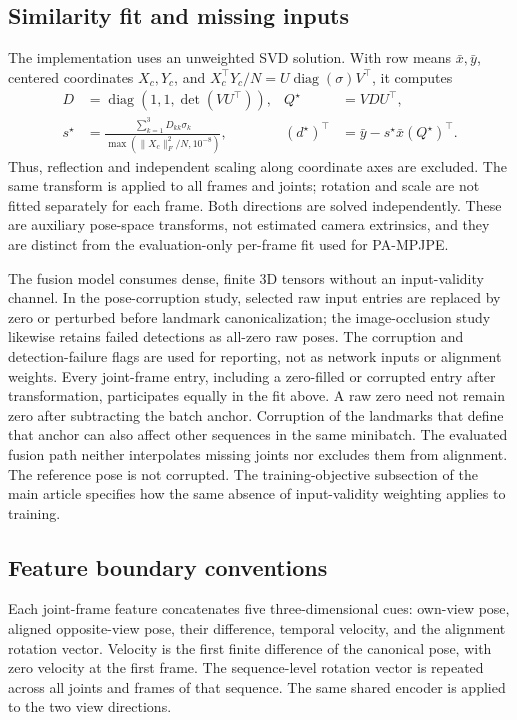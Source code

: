\documentclass[11pt,letterpaper]{article}
\begin{document}
\subsection{Similarity fit and missing inputs}
The implementation uses an unweighted SVD solution. With row means \(\bar{x},\bar{y}\), centered coordinates \(X_c,Y_c\), and \(X_c^\top Y_c/N=U\operatorname{diag}(\sigma)V^\top\), it computes
\[
\begin{aligned}
D&=\operatorname{diag}(1,1,\det(VU^\top)), & Q^\star&=VDU^\top,\\
s^\star&=\frac{\sum_{k=1}^{3}D_{kk}\sigma_k}
{\max(\|X_c\|_F^2/N,10^{-8})}, &
(d^\star)^\top&=\bar{y}-s^\star\bar{x}(Q^\star)^\top.
\end{aligned}
\]
Thus, reflection and independent scaling along coordinate axes are excluded. The same transform is applied to all frames and joints; rotation and scale are not fitted separately for each frame. Both directions are solved independently. These are auxiliary pose-space transforms, not estimated camera extrinsics, and they are distinct from the evaluation-only per-frame fit used for PA-MPJPE.

The fusion model consumes dense, finite 3D tensors without an input-validity channel. In the pose-corruption study, selected raw input entries are replaced by zero or perturbed before landmark canonicalization; the image-occlusion study likewise retains failed detections as all-zero raw poses. The corruption and detection-failure flags are used for reporting, not as network inputs or alignment weights. Every joint-frame entry, including a zero-filled or corrupted entry after transformation, participates equally in the fit above. A raw zero need not remain zero after subtracting the batch anchor. Corruption of the landmarks that define that anchor can also affect other sequences in the same minibatch. The evaluated fusion path neither interpolates missing joints nor excludes them from alignment. The reference pose is not corrupted. The training-objective subsection of the main article specifies how the same absence of input-validity weighting applies to training.

\subsection{Feature boundary conventions}
Each joint-frame feature concatenates five three-dimensional cues: own-view pose, aligned opposite-view pose, their difference, temporal velocity, and the alignment rotation vector. Velocity is the first finite difference of the canonical pose, with zero velocity at the first frame. The sequence-level rotation vector is repeated across all joints and frames of that sequence. The same shared encoder is applied to the two view directions.
\end{document}
